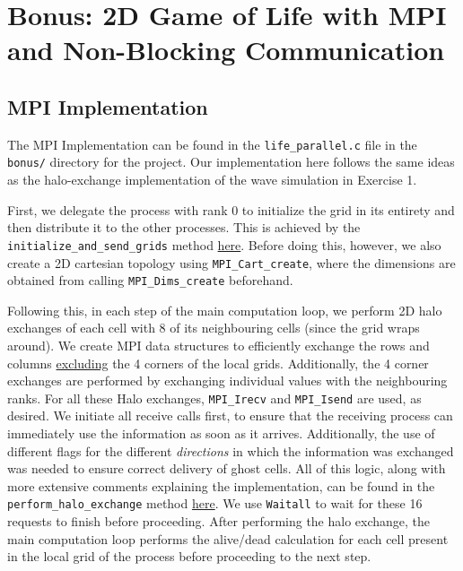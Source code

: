 \documentclass[a4paper,10pt]{article}
\begin{document}
\section{Bonus: 2D Game of Life with MPI and Non-Blocking Communication}
\subsection{MPI Implementation}
The MPI Implementation can be found in the \verb|life_parallel.c| file in the \verb|bonus/| directory for the project. Our implementation here follows the same ideas as the halo-exchange implementation of the wave simulation in Exercise 1. 

First, we delegate the process with rank 0 to initialize the grid in its entirety and then distribute it to the other processes. This is achieved by the \verb|initialize_and_send_grids| method \href{https://github.com/paulmyr/DD2356-MethodsHPC/blob/master/4_mpi/bonus/life_parallel.c#L34}{here}. Before doing this, however, we also create a 2D cartesian topology using \verb|MPI_Cart_create|, where the dimensions are obtained from calling \verb|MPI_Dims_create| beforehand. 

Following this, in each step of the main computation loop, we perform 2D halo exchanges of each cell with 8 of its neighbouring cells (since the grid wraps around). We create MPI data structures to efficiently exchange the rows and columns \underline{excluding} the 4 corners of the local grids. Additionally, the 4 corner exchanges are performed by exchanging individual values with the neighbouring ranks. For all these Halo exchanges, \verb|MPI_Irecv| and \verb|MPI_Isend| are used, as desired. We initiate all receive calls first, to ensure that the receiving process can immediately use the information as soon as it arrives. Additionally, the use of different flags for the different \textit{directions} in which the information was exchanged was needed to ensure correct delivery of ghost cells. All of this logic, along with more extensive comments explaining the implementation, can be found in the \verb|perform_halo_exchange| method \href{https://github.com/paulmyr/DD2356-MethodsHPC/blob/master/4_mpi/bonus/life_parallel.c#L119}{here}. We use \verb|Waitall| to wait for these 16 requests to finish before proceeding. After performing the halo exchange, the main computation loop performs the alive/dead calculation for each cell present in the local grid of the process before proceeding to the next step.
\end{document}
